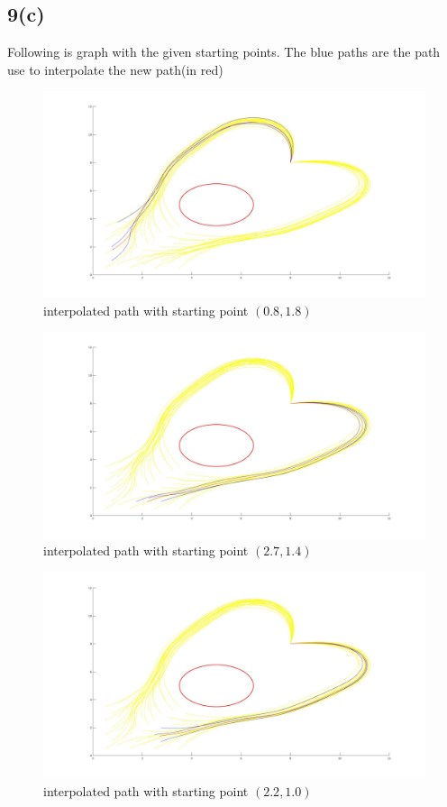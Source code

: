 \documentclass{article}
\begin{document}
\subsection*{9(c)}
Following is graph with the given starting points. The blue paths are the path use to interpolate the new path(in red)
\begin{figure}[H]
\centering
\includegraphics[width=6in]{p9-1.jpg}
\caption{interpolated path with starting point $(0.8, 1.8)$}
\end{figure}
\begin{figure}[H]
\centering
\includegraphics[width=6in]{p9-2.jpg}
\caption{interpolated path with starting point $(2.7, 1.4)$}
\end{figure}
\begin{figure}[H]
\centering
\includegraphics[width=6in]{p9-3.jpg}
\caption{interpolated path with starting point $(2.2, 1.0)$}
\end{figure}
\end{document}
